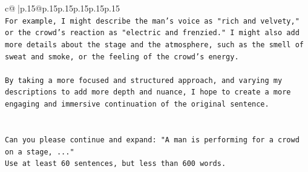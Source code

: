 \documentclass{article}
\begin{document}
{\begin{supertabular}{c@{$\;$}|p{.15\linewidth}@{}p{.15\linewidth}p{.15\linewidth}p{.15\linewidth}p{.15\linewidth}p{.15\linewidth}}
{{{\\ 
\texttt{For example, I might describe the man's voice as "rich and velvety," or the crowd's reaction as "electric and frenzied." I might also add more details about the stage and the atmosphere, such as the smell of sweat and smoke, or the feeling of the crowd's energy.} \\
\\ 
\texttt{By taking a more focused and structured approach, and varying my descriptions to add more depth and nuance, I hope to create a more engaging and immersive continuation of the original sentence.} \\
\\ 
\\ 
\texttt{Can you please continue and expand: "A man is performing for a crowd on a stage, ..."} \\
\texttt{Use at least 60 sentences, but less than 600 words.} \\
            }
        }
    }
     \\ \\


\end{supertabular}}
\end{document}
